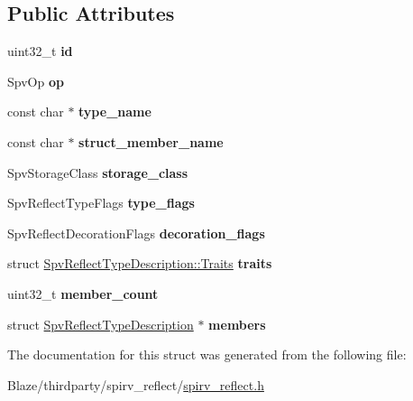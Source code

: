 \subsection*{Public Attributes}
\begin{DoxyCompactItemize}
\item 
\mbox{\label{structSpvReflectTypeDescription_a08aa234332314b93be92bf3b07e6420f}} 
uint32\+\_\+t {\bfseries id}
\item 
\mbox{\label{structSpvReflectTypeDescription_abe176492ba550dcebe430d5ce4d10ee7}} 
Spv\+Op {\bfseries op}
\item 
\mbox{\label{structSpvReflectTypeDescription_abf542abd0b687cf277aa98025f978358}} 
const char $\ast$ {\bfseries type\+\_\+name}
\item 
\mbox{\label{structSpvReflectTypeDescription_a80edeb33f766bbcc521b4cd45e8c6522}} 
const char $\ast$ {\bfseries struct\+\_\+member\+\_\+name}
\item 
\mbox{\label{structSpvReflectTypeDescription_a77c02c356556863231c79ee410eef3eb}} 
Spv\+Storage\+Class {\bfseries storage\+\_\+class}
\item 
\mbox{\label{structSpvReflectTypeDescription_a33fa73bb35aa77418bc52fa8e644bfb3}} 
Spv\+Reflect\+Type\+Flags {\bfseries type\+\_\+flags}
\item 
\mbox{\label{structSpvReflectTypeDescription_a688114ea4520ed49fc1c2310ad4b4da9}} 
Spv\+Reflect\+Decoration\+Flags {\bfseries decoration\+\_\+flags}
\item 
\mbox{\label{structSpvReflectTypeDescription_aadec55e932544cb27a8a265fdada049d}} 
struct \hyperlink{structSpvReflectTypeDescription_1_1Traits}{Spv\+Reflect\+Type\+Description\+::\+Traits} {\bfseries traits}
\item 
\mbox{\label{structSpvReflectTypeDescription_aadb375894fe627f1d0471fbf08dd9aff}} 
uint32\+\_\+t {\bfseries member\+\_\+count}
\item 
\mbox{\label{structSpvReflectTypeDescription_a7c8b89946257ca68df85118df657230d}} 
struct \hyperlink{structSpvReflectTypeDescription}{Spv\+Reflect\+Type\+Description} $\ast$ {\bfseries members}
\end{DoxyCompactItemize}


The documentation for this struct was generated from the following file\+:\begin{DoxyCompactItemize}
\item 
Blaze/thirdparty/spirv\+\_\+reflect/\hyperlink{spirv__reflect_8h}{spirv\+\_\+reflect.\+h}\end{DoxyCompactItemize}
